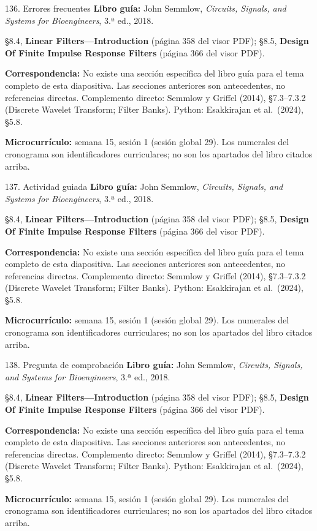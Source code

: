 \documentclass[
  10pt,
  ignorenonframetext,
  aspectratio=169,
  spanish,
]{beamer}
\begin{document}
\begin{frame}{136. Errores frecuentes}
\label{errores-frecuentes-8}
\textbf{Libro guía:} John Semmlow, \emph{Circuits, Signals, and Systems
for Bioengineers}, 3.ª ed., 2018.

§8.4, \textbf{Linear Filters---Introduction} (página 358 del visor PDF);
§8.5, \textbf{Design Of Finite Impulse Response Filters} (página 366 del
visor PDF).

\textbf{Correspondencia:} No existe una sección específica del libro
guía para el tema completo de esta diapositiva. Las secciones anteriores
son antecedentes, no referencias directas. Complemento directo: Semmlow
y Griffel (2014), §7.3--7.3.2 (Discrete Wavelet Transform; Filter
Banks). Python: Esakkirajan et al.~(2024), §5.8.

\textbf{Microcurrículo:} semana 15, sesión 1 (sesión global 29). Los
numerales del cronograma son identificadores curriculares; no son los
apartados del libro citados arriba.
\end{frame}

\begin{frame}{137. Actividad guiada}
\label{actividad-guiada-8}
\textbf{Libro guía:} John Semmlow, \emph{Circuits, Signals, and Systems
for Bioengineers}, 3.ª ed., 2018.

§8.4, \textbf{Linear Filters---Introduction} (página 358 del visor PDF);
§8.5, \textbf{Design Of Finite Impulse Response Filters} (página 366 del
visor PDF).

\textbf{Correspondencia:} No existe una sección específica del libro
guía para el tema completo de esta diapositiva. Las secciones anteriores
son antecedentes, no referencias directas. Complemento directo: Semmlow
y Griffel (2014), §7.3--7.3.2 (Discrete Wavelet Transform; Filter
Banks). Python: Esakkirajan et al.~(2024), §5.8.

\textbf{Microcurrículo:} semana 15, sesión 1 (sesión global 29). Los
numerales del cronograma son identificadores curriculares; no son los
apartados del libro citados arriba.
\end{frame}

\begin{frame}{138. Pregunta de comprobación}
\label{pregunta-de-comprobaciuxf3n-8}
\textbf{Libro guía:} John Semmlow, \emph{Circuits, Signals, and Systems
for Bioengineers}, 3.ª ed., 2018.

§8.4, \textbf{Linear Filters---Introduction} (página 358 del visor PDF);
§8.5, \textbf{Design Of Finite Impulse Response Filters} (página 366 del
visor PDF).

\textbf{Correspondencia:} No existe una sección específica del libro
guía para el tema completo de esta diapositiva. Las secciones anteriores
son antecedentes, no referencias directas. Complemento directo: Semmlow
y Griffel (2014), §7.3--7.3.2 (Discrete Wavelet Transform; Filter
Banks). Python: Esakkirajan et al.~(2024), §5.8.

\textbf{Microcurrículo:} semana 15, sesión 1 (sesión global 29). Los
numerales del cronograma son identificadores curriculares; no son los
apartados del libro citados arriba.
\end{frame}
\end{document}
